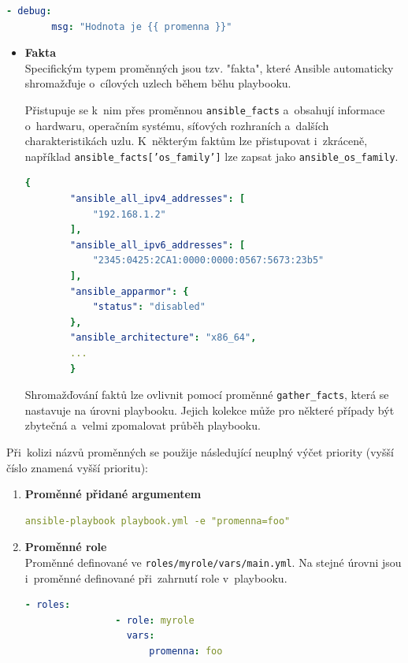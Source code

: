 \begin{itemize}
    \begin{lstlisting}[language=YAML, caption={Použití proměnné}, label={lst:ansiblepromennapouziti}, captionpos=b]
    - debug:
        msg: "Hodnota je {{ promenna }}"
    \end{lstlisting}

    \begin{itemize}
        \item \textbf{Fakta} \\
        Specifickým typem proměnných jsou tzv. "fakta", které Ansible automaticky shromažďuje o~cílových uzlech během běhu playbooku.
        
        Přistupuje se k~nim přes proměnnou \texttt{ansible\_facts} a~obsahují informace o~hardwaru, operačním systému, síťových rozhraních a~dalších charakteristikách uzlu.
        K~některým faktům lze přistupovat i~zkráceně, například \texttt{ansible\_facts['os\_family']} lze zapsat jako \texttt{ansible\_os\_family}. \cite{ansibledocs}
         
        \begin{lstlisting}[language=YAML, caption={Shromážděná fakta}, label={lst:ansiblefacts}, captionpos=b]
        {
        "ansible_all_ipv4_addresses": [
            "192.168.1.2"
        ],
        "ansible_all_ipv6_addresses": [
            "2345:0425:2CA1:0000:0000:0567:5673:23b5"
        ],
        "ansible_apparmor": {
            "status": "disabled"
        },
        "ansible_architecture": "x86_64",
        ...
        }
        \end{lstlisting}

        Shromažďování faktů lze ovlivnit pomocí proměnné \texttt{gather\_facts}, která se nastavuje na úrovni playbooku.
        Jejich kolekce může pro některé případy být zbytečná a~velmi zpomalovat průběh playbooku. \cite{ansibledocs}
    \end{itemize}

    Při~kolizi názvů proměnných se použije následující neuplný výčet priority (vyšší číslo znamená vyšší prioritu):
    \begin{enumerate}
        \item \textbf{Proměnné přidané argumentem}
        \begin{lstlisting}[language=YAML, caption={Proměnné přidané argumentem}, label={lst:ansibleargumentvar}, captionpos=b]
        ansible-playbook playbook.yml -e "promenna=foo"
        \end{lstlisting}

        \item \textbf{Proměnné role} \\
            Proměnné definované ve \texttt{roles/myrole/vars/main.yml}.
            Na stejné úrovni jsou i~proměnné definované při~zahrnutí role v~playbooku.
            \begin{lstlisting}[language=YAML, caption={Proměnné při~zahrnutí role}, label={lst:ansiblerolevar}, captionpos=b]
            - roles:
                - role: myrole
                  vars: 
                      promenna: foo
            \end{lstlisting}


\end{enumerate}
\end{itemize}
